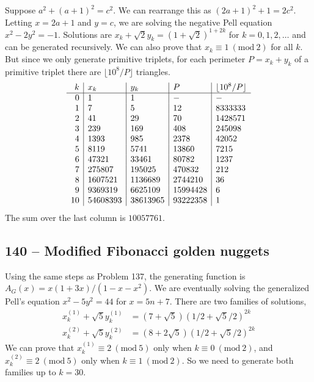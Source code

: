 \documentclass{article}
\newcommand{\Mod}[1]{\ (\mathrm{mod}\ #1)}
\begin{document}
Suppose $a^2 + (a+1)^2 = c^2$. 
We can rearrange this as $(2a+1)^2 + 1 = 2c^2$. 
Letting $x = 2a+1$ and $y = c$, we are solving the negative Pell equation $x^2 - 2y^2 = -1$. 
Solutions are $x_k + \sqrt{2} y_k = (1+\sqrt{2})^{1+2k}$ for $k = 0, 1, 2, \dotsc$ and can be generated recursively. 
We can also prove that $x_k \equiv 1 \Mod{2}$ for all $k$.
But since we only generate primitive triplets, for each perimeter $P = x_k + y_k$ of a primitive triplet there are $\lfloor 10^8/P \rfloor$ triangles.
\begin{align*}
	\begin{array}{r | l | l | l | l }
	k & x_k & y_k & P & \lfloor 10^8 / P \rfloor \\ \hline
	0 & 1 & 1 & - & - \\
	1 & 7 & 5 & 12 & 8333333 \\
	2 & 41 & 29 & 70 & 1428571 \\
	3 & 239 & 169 & 408 & 245098 \\
	4 & 1393 & 985 & 2378 & 42052 \\
	5 & 8119 & 5741 & 13860 & 7215 \\
	6 & 47321 & 33461 & 80782 & 1237 \\
	7 & 275807 & 195025 & 470832 & 212 \\
	8 & 1607521 & 1136689 & 2744210 & 36 \\
	9 & 9369319 & 6625109 & 15994428 & 6 \\
	10 & 54608393 & 38613965 & 93222358 & 1  \\
	\end{array}
\end{align*}
The sum over the last column is $\boxed{10057761}$.


\subsection*{140 -- Modified Fibonacci golden nuggets} 
Using the same steps as Problem 137, the generating function is $A_G(x) = x(1+3x)/(1-x-x^2)$. 
We are eventually solving the generalized Pell's equation $x^2 - 5y^2 = 44$ for $x = 5n+7$. 
There are two families of solutions, 
\begin{align*}
	x_k^{(1)} + \sqrt{5} y_k^{(1)} &= (7 + \sqrt{5})(1/2 + \sqrt{5}/2)^{2k} \\
	x_k^{(2)} + \sqrt{5} y_k^{(2)} &= (8 + 2\sqrt{5})(1/2 + \sqrt{5}/2)^{2k}
\end{align*}
We can prove that $x_k^{(1)} \equiv 2 \Mod 5$ only when $k \equiv 0 \Mod 2$, and $x_k^{(2)} \equiv 2 \Mod 5$ only when $k \equiv 1 \Mod 2$.
So we need to generate both families up to $k=30$.
\end{document}
